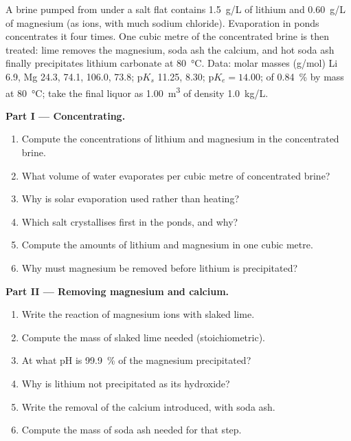 \begin{problem}
\label{pb:b1:s-block:1}
A brine pumped from under a salt flat contains \qty{1.5}{g/L} of lithium
and \qty{0.60}{g/L} of magnesium (as ions, with much sodium chloride).
Evaporation in ponds concentrates it four times. One cubic metre of the
concentrated brine is then treated: lime removes the magnesium, soda ash
the calcium, and hot soda ash finally precipitates lithium carbonate at
\qty{80}{\celsius}. Data: molar masses (\unit{g/mol}) Li 6.9, Mg 24.3,
 74.1,  106.0,  73.8; $\mathrm{p}K_s$
 11.25,  8.30; $\mathrm{p}K_e = 14.00$; 
of  \qty{0.84}{\percent} by mass at \qty{80}{\celsius}; take
the final liquor as \qty{1.00}{m^3} of density \qty{1.0}{kg/L}.

\medskip
\noindent\textbf{Part I --- Concentrating.}
\begin{enumerate}
  \item Compute the concentrations of lithium and magnesium in the
        concentrated brine.
  \item What volume of water evaporates per cubic metre of concentrated
        brine?
  \item Why is solar evaporation used rather than heating?
  \item Which salt crystallises first in the ponds, and why?
  \item Compute the amounts of lithium and magnesium in one cubic metre.
  \item Why must magnesium be removed before lithium is precipitated?
\end{enumerate}

\medskip
\noindent\textbf{Part II --- Removing magnesium and calcium.}
\begin{enumerate}[resume]
  \item Write the reaction of magnesium ions with slaked lime.
  \item Compute the mass of slaked lime needed (stoichiometric).
  \item At what pH is \qty{99.9}{\percent} of the magnesium precipitated?
  \item Why is lithium not precipitated as its hydroxide?
  \item Write the removal of the calcium introduced, with soda ash.
  \item Compute the mass of soda ash needed for that step.
\end{enumerate}


\end{problem}
